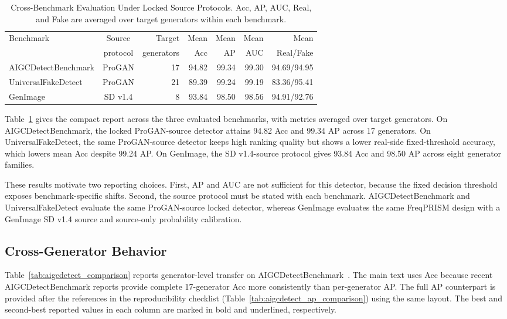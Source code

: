 \documentclass[lettersize,journal]{IEEEtran}
\begin{document}
\begin{table}[t]
\caption{Cross-Benchmark Evaluation Under Locked Source Protocols. Acc, AP, AUC, Real, and Fake are averaged over target generators within each benchmark.}
\label{tab:benchmark_summary}
\centering
\scriptsize
\renewcommand{\arraystretch}{1.08}
\setlength{\tabcolsep}{2.8pt}
\begin{tabular}{@{}lcrrrrr@{}}
\toprule
Benchmark & Source & Target & Mean & Mean & Mean & Mean \\
 & protocol & generators & Acc & AP & AUC & Real/Fake \\
\midrule
AIGCDetectBenchmark & ProGAN & 17 & 94.82 & 99.34 & 99.30 & 94.69/94.95 \\
UniversalFakeDetect & ProGAN & 21 & 89.39 & 99.24 & 99.19 & 83.36/95.41 \\
GenImage & SD v1.4 & 8 & 93.84 & 98.50 & 98.56 & 94.91/92.76 \\
\bottomrule
\end{tabular}
\end{table}

Table~\ref{tab:benchmark_summary} gives the compact report across the three evaluated benchmarks, with metrics averaged over target generators. On AIGCDetectBenchmark, the locked ProGAN-source detector attains 94.82 Acc and 99.34 AP across 17 generators. On UniversalFakeDetect, the same ProGAN-source detector keeps high ranking quality but shows a lower real-side fixed-threshold accuracy, which lowers mean Acc despite 99.24 AP. On GenImage, the SD v1.4-source protocol gives 93.84 Acc and 98.50 AP across eight generator families.

These results motivate two reporting choices. First, AP and AUC are not sufficient for this detector, because the fixed decision threshold exposes benchmark-specific shifts. Second, the source protocol must be stated with each benchmark. AIGCDetectBenchmark and UniversalFakeDetect evaluate the same ProGAN-source locked detector, whereas GenImage evaluates the same FreqPRISM design with a GenImage SD v1.4 source and source-only probability calibration.

\subsection{Cross-Generator Behavior}
\label{sec:cross_generator_behavior}

Table~\ref{tab:aigcdetect_comparison} reports generator-level transfer on AIGCDetectBenchmark~\cite{zhong2023patchcraft}. The main text uses Acc because recent AIGCDetectBenchmark reports provide complete 17-generator Acc more consistently than per-generator AP. The full AP counterpart is provided after the references in the reproducibility checklist (Table~\ref{tab:aigcdetect_ap_comparison}) using the same layout. The best and second-best reported values in each column are marked in bold and underlined, respectively.
\end{document}
